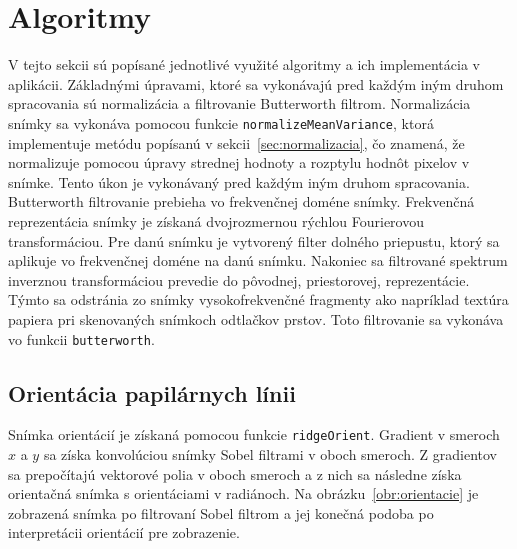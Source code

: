   \section{Algoritmy}
  V tejto sekcii sú popísané jednotlivé využité algoritmy a ich implementácia v aplikácii.
  Základnými úpravami, ktoré sa vykonávajú pred každým iným druhom spracovania sú normalizácia a filtrovanie Butterworth filtrom.
  Normalizácia snímky sa vykonáva pomocou funkcie \texttt{normalizeMeanVariance}, ktorá implementuje metódu
  popísanú v sekcii~{\ref{sec:normalizacia}}, čo znamená, že normalizuje pomocou úpravy strednej hodnoty a rozptylu hodnôt pixelov v snímke. Tento úkon je
  vykonávaný pred každým iným druhom spracovania.\\
  Butterworth filtrovanie prebieha vo frekvenčnej doméne snímky. Frekvenčná reprezentácia snímky je získaná dvojrozmernou rýchlou Fourierovou transformáciou.
  Pre danú snímku je vytvorený filter dolného priepustu, ktorý sa aplikuje vo frekvenčnej doméne na danú snímku. Nakoniec sa filtrované spektrum inverznou
  transformáciou prevedie do pôvodnej, priestorovej, reprezentácie. Týmto sa odstránia zo snímky vysokofrekvenčné fragmenty ako napríklad textúra papiera
  pri skenovaných snímkoch odtlačkov prstov. Toto filtrovanie sa vykonáva vo funkcii \texttt{butterworth}.

  \subsection{Orientácia papilárnych línii}
  Snímka orientácií je získaná pomocou funkcie \texttt{ridgeOrient}. Gradient v smeroch $x$ a $y$ sa získa konvolúciou snímky Sobel filtrami v oboch smeroch.
  Z gradientov sa prepočítajú vektorové polia v oboch smeroch a z nich sa následne získa orientačná snímka s orientáciami v radiánoch.
  Na obrázku~{\ref{obr:orientacie}} je zobrazená snímka po filtrovaní Sobel filtrom a jej konečná podoba po interpretácii orientácií pre zobrazenie.

